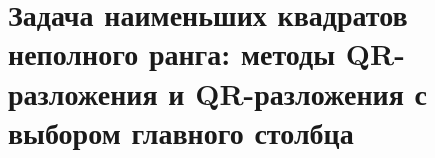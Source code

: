 \section{Задача наименьших квадратов неполного ранга: методы QR-разложения и QR-разложения с выбором главного столбца}
